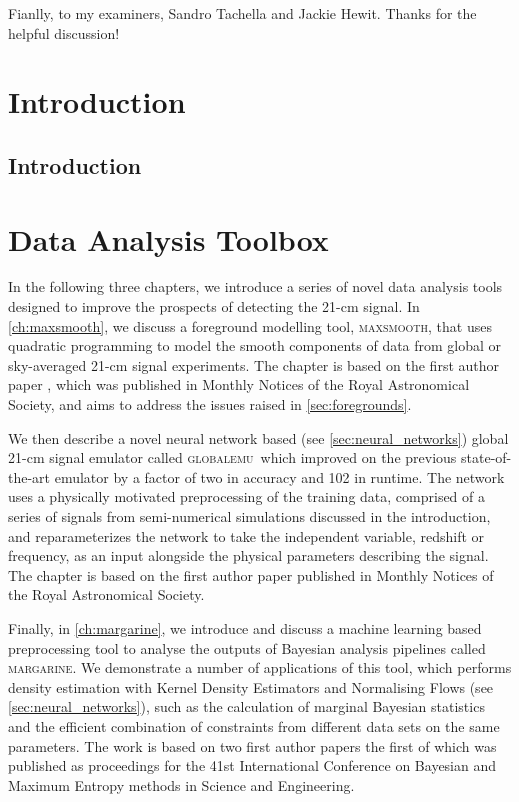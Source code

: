 \documentclass[a4paper,11pt,twoside,extrafontsizes,oldfontcommands]{memoir}
\newcommand{\name}{\textsc{globalemu}}
\newcommand{\maxsmooth}{\textsc{maxsmooth}}
\begin{document}
Fianlly, to my examiners, Sandro Tachella and Jackie Hewit. Thanks for the helpful discussion!

\part{Introduction}

\chapter{Introduction}
\label{ch:introduction}


\part{Data Analysis Toolbox}

In the following three chapters, we introduce a series of novel data analysis tools designed to improve the prospects of detecting the 21-cm signal. In \cref{ch:maxsmooth}, we discuss a foreground modelling tool, \maxsmooth, that uses quadratic programming to model the smooth components of data from global or sky-averaged 21-cm signal experiments. The chapter is based on the first author paper \cite{Bevins_maxsmooth_2021}, which was published in Monthly Notices of the Royal Astronomical Society, and aims to address the issues raised in \cref{sec:foregrounds}.

We then describe a novel neural network based (see \cref{sec:neural_networks}) global 21-cm signal emulator called \name~which improved on the previous state-of-the-art emulator by a factor of two in accuracy and 102 in runtime. The network uses a physically motivated preprocessing of the training data, comprised of a series of signals from semi-numerical simulations discussed in the introduction, and reparameterizes the network to take the independent variable, redshift or frequency, as an input alongside the physical parameters describing the signal. The chapter is based on the first author paper \cite{Bevins_globalemu_2021} published in Monthly Notices of the Royal Astronomical Society.

Finally, in \cref{ch:margarine}, we introduce and discuss a machine learning based preprocessing tool to analyse the outputs of Bayesian analysis pipelines called \textsc{margarine}. We demonstrate a number of applications of this tool, which performs density estimation with Kernel Density Estimators and Normalising Flows (see \cref{sec:neural_networks}), such as the calculation of marginal Bayesian statistics and the efficient combination of constraints from different data sets on the same parameters. The work is based on two first author papers \cite{margarine_maxent, margarine_neurips} the first of which was published as proceedings for the 41st International Conference on Bayesian and Maximum Entropy methods in Science and Engineering.
\end{document}
